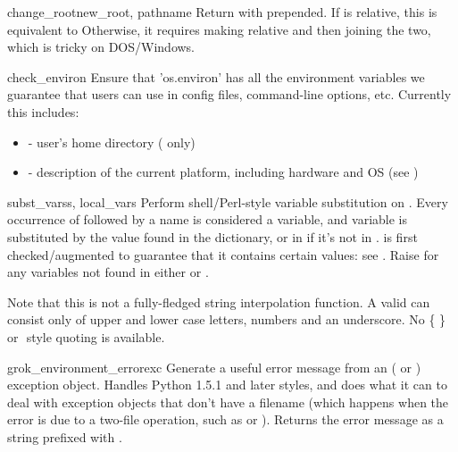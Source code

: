 \documentclass{manual}
\begin{document}
\begin{funcdesc}{change_root}{new_root, pathname}
Return  with  prepended.  If  is
relative, this is equivalent to 
Otherwise, it requires making  relative and then joining the
two, which is tricky on DOS/Windows.
\end{funcdesc}

\begin{funcdesc}{check_environ}{}
Ensure that 'os.environ' has all the environment variables we
guarantee that users can use in config files, command-line options,
etc.  Currently this includes:
\begin{itemize}
\item {} - user's home directory (\UNIX{} only)
\item {} - description of the current platform, including
      hardware and OS (see )
\end{itemize}
\end{funcdesc}

\begin{funcdesc}{subst_vars}{s, local_vars}
Perform shell/Perl-style variable substitution on .  Every
occurrence of \code{\$} followed by a name is considered a variable, and
variable is substituted by the value found in the 
dictionary, or in  if it's not in .
 is first checked/augmented to guarantee that it contains
certain values: see .  Raise  
for any variables not found in either  or .

Note that this is not a fully-fledged string interpolation function. A
valid  can consist only of upper and lower case letters,
numbers and an underscore. No \{ \} or \( \) style quoting is available.
\end{funcdesc}

\begin{funcdesc}{grok_environment_error}{exc}
Generate a useful error message from an  
( or ) exception object.  
Handles Python 1.5.1 and later styles, and does what it can to deal with 
exception objects that don't have a filename (which happens when the error 
is due to a two-file operation, such as  or 
).  Returns the error message as a string prefixed 
with .
\end{funcdesc}
\end{document}
